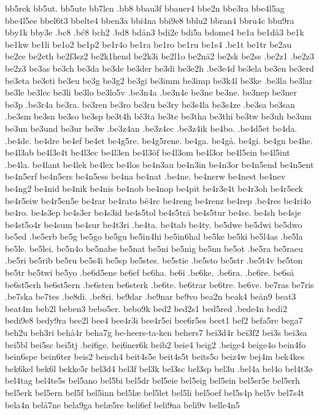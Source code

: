 bb5rek
bb5ut.
bb5ute
bb7len
.bb8
bbau3f
bbauer4
bbe2n
bbe3ra
bbe4l5ag
bbe4l5ee
bbel6t3
bbelte4
bben3a
bbi4na
bbi9e8
bblu2
bbran4
bbru4c
bbu9ra
bby1k
bby3e
.bc8
.bć8
bch2
.bd8
bdän3
bdi2e
bdi5a
bdome4
be1a
be1då3
be1k
be1kw
be1li
be1o2
be1p2
be1r4o
be1ra
be1ro
be1ru
be1s4
.be1t
be1tr
be2au
be2ce
be2eth
be2f3sz2
be2k1hend
be2k3i
be2l1o
be2nä2
be2sk
be2ss
.be2z1
.be2z3
be2z3
be3as
be3ch
be3da
be3de
be3der
be3di
be3e2h
.be3e4d
be3ela
be3en
be3erd
be3eta
be3eti
be3eu
be3g
be3g2
be3gi
be3imm
be3imp
be3k4l
be3ke
.be3la
be3lar
be3le
be3lec
be3li
be3lo
be3lo5v
.be3n4a
.be3n4e
be3ne
be3ne.
be3nep
be3ner
be3p
.be3r4a
be3ra.
be3ren
be3ro
be3ru
be3ry
be3s4la
be3s4ze
.be3sa
be3san
.be3sm
be3sn
be3so
be3sp
be3t4h
bě3ta
be3te
be3tha
be3thi
be3tw
be3uh
be3um
be3un
be3und
be3ur
be3w
.be3z4an
.be3z4ec
.be3z4ik
be4bo.
.be4d5et
be4da.
.be4de.
be4dre
be4ef
be4et
be4g5re.
be4g5rene.
be4ga.
be4gå.
be4gi.
be4gn
be4he.
be4l3ab
be4l3e4t
be4l3ec
be4l3en
be4l3öf
be4l3om
be4l3or
be4l5ein
be4l5int
.be4la.
be4lant
be4lek
be4lex
be4los
be4n3au
be4n3in
be4n3or
be4n5end
be4n5ent
be4n5erf
be4n5ers
be4n5ess
be4na
be4nat
.be4ne.
be4nerw
be4nest
be4nev
be4ng2
be4nid
be4nik
be4nis
be4nob
be4nop
be4pit
be4r3e4t
be4r3oh
be4r5eck
be4r5eiw
be4r5en5e
be4rar
be4rato
bé4rc
be4reng
be4renz
be4rep
.be4res
be4ri4o
be4ro.
be4s3ep
be4s3er
be4s3id
be4s5tol
be4s5trä
be4s5tur
be4se.
be4sh
be4sje
be4st5o4r
be4sum
be4sur
be4t3ri
.be4ta.
be4tab
be4ty.
be5dwe
be5dwi
be5dwo
be5ed
.be5erb
be5g
be5go
be5gu
be5in4hi
be5in6hal
be5ke
be5ki
be5l4as
.be5la
be5le.
be5lei.
be5n4o
be5nabe
be5nat
be5ni
be5nig
be5nu
be5ot
.be5ra
be5raeu
.be5ri
be5rib
be5ru
be5s4i
be5sp
be5stes.
be5stie
.be5sto
be5str
.be5t4v
be5ton
be5tr
be5twi
be5yo
.be6d5ene
be6ef
be6ha.
be6i
.be6ke.
.be6ra.
.be6re.
be6så
be6st5erh
be6st5ern
.be6sten
be6sterk
.be6te.
be6trar
be6tre.
be6ve.
be7ras
be7ris
.be7ska
be7tes
.be8di.
.be8ri.
be9dar
.be9nar
be9vo
bea2n
beak4
beån9
beat3
beat4m
beb2l
beben3
bebo5er.
bebo9k
bed2
bed2s1
bed5red
.bede4n
bedi2
bedi9e8
bedy9ra
bee2l
bee4
bee4r3i
bee4r5ei
bee6r5es
beet1
bef2
befa5re
bega7
beh2u
beh3ri
behå4r
beha7g
be-heers-ta-ken
behers7
bei3d4r
bei3f2
bei3s
bei3sa
bei5bl
bei5sc
bei5tj
.bei6ge.
bei6ner6k
beib2
beie4
beig2
.beige4
beige4o
bein4fo
bein6spe
bein6ter
beis2
beisch4
beit4s5e
beit4s5t
beits5o
beiz4w
bej4m
bek4kes
bek6kel
bek6l
bekke5r
bel3d4
bel3f
bel3k
bel3sc
bel3sp
bel3u
.bel4a
bel4o
bel4t3ø
bel4tag
bel4te5s
bel5ano
bel5bi
bel5dr
bel5eie
bel5eig
bel5ein
bel5er5e
bel5erh
bel5erk
bel5ern
bel5f
bel5inn
bel5læ
bel5let
bel5li
bel5oef
bel5s4p
bel5v
bel7s4t
bela4n
belå7ne
bela9ga
belæ5re
beli6ef
beli9na
beli9v
belle4n5
